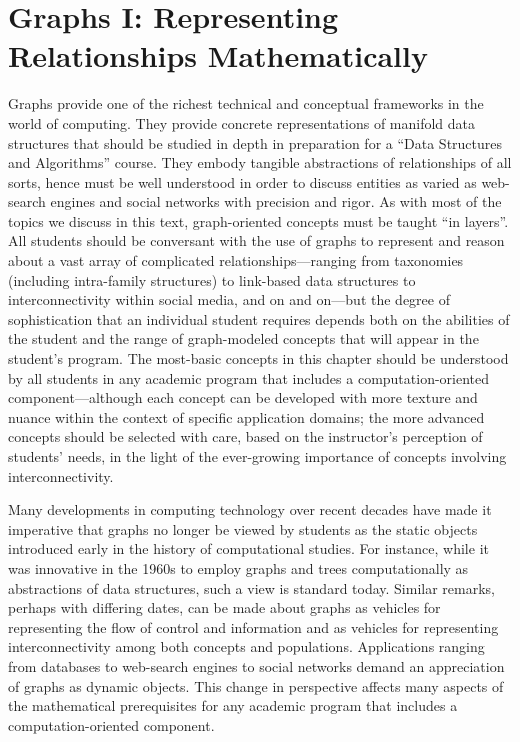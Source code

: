 
\chapter{Graphs I:
Representing Relationships Mathematically}
\label{ch:Graphs1}

Graphs provide one of the richest technical and conceptual frameworks
in the world of computing.  They provide concrete representations of
manifold data structures that should be studied in depth
in preparation for a ``Data Structures and Algorithms'' course.  They
embody tangible abstractions of relationships of all sorts, hence must
be well understood in order to discuss entities as varied as
web-search engines and social networks with precision and rigor.  As
with most of the topics we discuss in this text, graph-oriented
concepts must be taught ``in layers''.  All students should be
conversant with the use of graphs to represent and reason about a vast
array of complicated relationships---ranging from taxonomies
(including intra-family structures) to link-based data structures to
interconnectivity within social media, and on and on---but the degree
of sophistication that an individual student requires depends both on
the abilities of the student and the range of graph-modeled concepts
that will appear in the student's program.  The most-basic concepts in
this chapter should be understood by all students in any academic
program that includes a computation-oriented component---although each
concept can be developed with more texture and nuance within the
context of specific application domains; the more advanced concepts
should be selected with care, based on the instructor's perception of
students' needs, in the light of the ever-growing importance of
concepts involving interconnectivity.

Many developments in computing technology over recent decades have
made it imperative that graphs no longer be viewed by students as the
static objects introduced early in the history of computational
studies.  For instance, while it was innovative in the 1960s to employ
graphs and trees computationally as abstractions of data structures, such a view
is standard today.  Similar remarks, perhaps with differing dates, can
be made about graphs as vehicles for representing the flow of control
and information and as vehicles for representing interconnectivity
among both concepts and populations.  Applications ranging from
databases to web-search engines to social networks demand an
appreciation of graphs as dynamic objects.  This change in perspective
affects many aspects of the mathematical prerequisites for any
academic program that includes a computation-oriented component.


